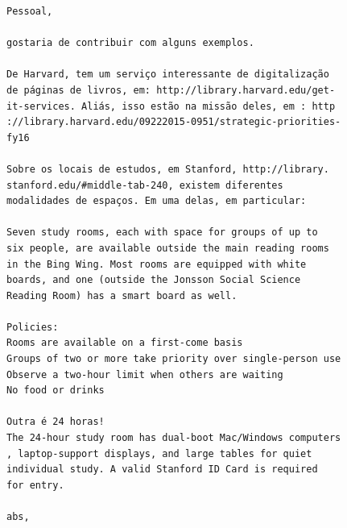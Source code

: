 \documentclass[titlepage]{article}
\begin{document}
\begin{lstlisting}[caption=Enviado por Giuliano Salcas Olguin]
Pessoal,

gostaria de contribuir com alguns exemplos.

De Harvard, tem um serviço interessante de digitalização 
de páginas de livros, em: http://library.harvard.edu/get-
it-services. Aliás, isso estão na missão deles, em : http
://library.harvard.edu/09222015-0951/strategic-priorities-
fy16

Sobre os locais de estudos, em Stanford, http://library.
stanford.edu/#middle-tab-240, existem diferentes 
modalidades de espaços. Em uma delas, em particular:

Seven study rooms, each with space for groups of up to 
six people, are available outside the main reading rooms 
in the Bing Wing. Most rooms are equipped with white 
boards, and one (outside the Jonsson Social Science 
Reading Room) has a smart board as well.

Policies:
Rooms are available on a first-come basis
Groups of two or more take priority over single-person use
Observe a two-hour limit when others are waiting
No food or drinks

Outra é 24 horas!
The 24-hour study room has dual-boot Mac/Windows computers
, laptop-support displays, and large tables for quiet 
individual study. A valid Stanford ID Card is required 
for entry.

abs,
\end{lstlisting}
\end{document}
